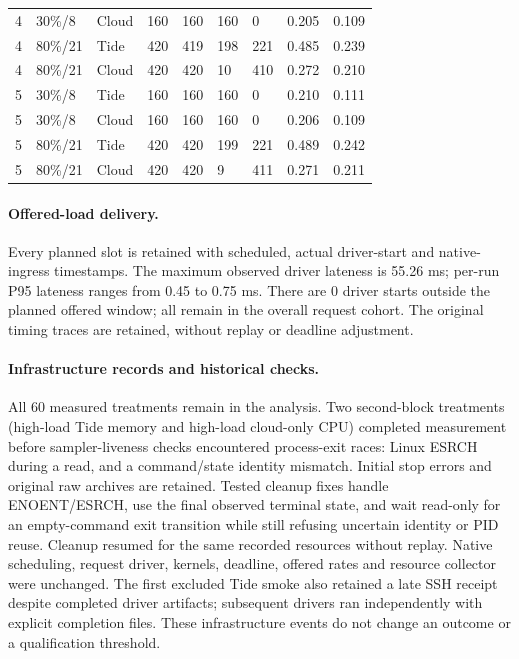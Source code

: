 \begin{table}[!htbp]
{\begin{tabular}{lllllllll}
4 & 30\%/8 & Cloud & 160 & 160 & 160 & 0 & 0.205 & 0.109 \\
4 & 80\%/21 & Tide & 420 & 419 & 198 & 221 & 0.485 & 0.239 \\
4 & 80\%/21 & Cloud & 420 & 420 & 10 & 410 & 0.272 & 0.210 \\
5 & 30\%/8 & Tide & 160 & 160 & 160 & 0 & 0.210 & 0.111 \\
5 & 30\%/8 & Cloud & 160 & 160 & 160 & 0 & 0.206 & 0.109 \\
5 & 80\%/21 & Tide & 420 & 420 & 199 & 221 & 0.489 & 0.242 \\
5 & 80\%/21 & Cloud & 420 & 420 & 9 & 411 & 0.271 & 0.211 \\
\bottomrule
\end{tabular}}
\end{table}

\clearpage
\paragraph{Offered-load delivery.} Every planned slot is retained with scheduled, actual driver-start and native-ingress timestamps. The maximum observed driver lateness is 55.26 ms; per-run P95 lateness ranges from 0.45 to 0.75 ms. There are 0 driver starts outside the planned offered window; all remain in the overall request cohort. The original timing traces are retained, without replay or deadline adjustment.

\paragraph{Infrastructure records and historical checks.}
All 60 measured treatments remain in the analysis. Two second-block treatments (high-load Tide memory and high-load cloud-only CPU) completed measurement before sampler-liveness checks encountered process-exit races: Linux ESRCH during a read, and a command/state identity mismatch. Initial stop errors and original raw archives are retained. Tested cleanup fixes handle ENOENT/ESRCH, use the final observed terminal state, and wait read-only for an empty-command exit transition while still refusing uncertain identity or PID reuse. Cleanup resumed for the same recorded resources without replay. Native scheduling, request driver, kernels, deadline, offered rates and resource collector were unchanged. The first excluded Tide smoke also retained a late SSH receipt despite completed driver artifacts; subsequent drivers ran independently with explicit completion files. These infrastructure events do not change an outcome or a qualification threshold.

